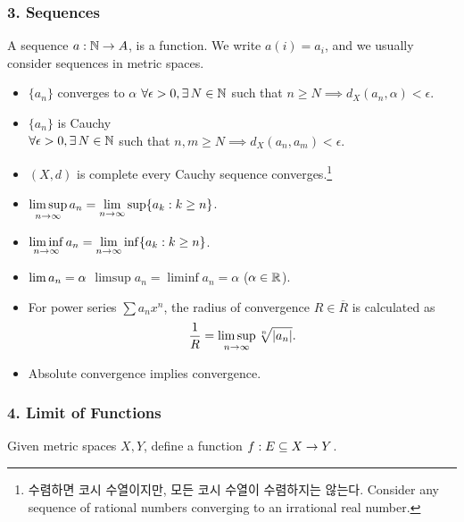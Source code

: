 \subsubsection*{3. Sequences}

A sequence \(a: \mathbb{N} \rightarrow A\), is a function. We write \(a(i) = a_i\), and we usually consider sequences in metric spaces.

\begin{itemize}
    \item \(\{a_n\}\) converges to \(\alpha\) \miff \(\forall \epsilon > 0, \exists N \in \N\) such that \(n \geq N \implies d_X(a_n, \alpha) < \epsilon\).
    \item {} \(\{a_n\}\) is Cauchy\\
          \miff \(\forall \epsilon > 0, \exists N \in \N\) such that \(n, m \geq N \implies d_X(a_n, a_m) < \epsilon\).
    \item \((X, d)\) is complete \miff every Cauchy sequence converges.\footnote{수렴하면 코시 수열이지만, 모든 코시 수열이 수렴하지는 않는다. Consider any sequence of rational numbers converging to an irrational real number.}
    \item \(\displaystyle \limsup_{n\rightarrow \infty} a_n = \lim_{n \rightarrow \infty} \sup \{a_k : k \geq n\}\).
    \item \(\displaystyle \liminf_{n \rightarrow \infty} a_n = \lim_{n \rightarrow \infty} \inf \{a_k : k \geq n\}\).
    \item \(\displaystyle \lim a_n = \alpha\) \miff \(\limsup a_n = \liminf a_n = \alpha\) (\(\alpha \in \mathbb{R}\)).
    \item For power series \(\sum a_n x^n\), the radius of convergence \(R \in \overline{R}\) is calculated as
          \[
              \frac{1}{R} = \limsup_{n \rightarrow \infty} \sqrt[n]{\left| a_n \right|}.
          \]
    \item Absolute convergence implies convergence.
\end{itemize}

\subsubsection*{4. Limit of Functions}

Given metric spaces \(X, Y\), define a function \(f: E \subseteq X \rightarrow Y\).

